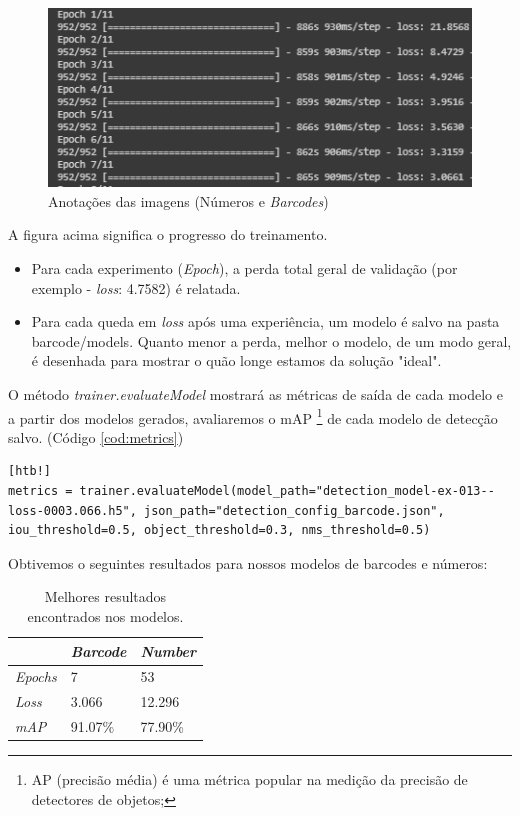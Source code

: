 \begin{figure}[htbp]
	\centering
	\includegraphics[width=1\linewidth]{figuras/MachineLearning/barcodeTraining.png}
	\caption{Anotações das imagens (Números e \textit{Barcodes})}
	\label{fig:barTrain}
\end{figure}

    A figura acima significa o progresso do treinamento.
\begin{itemize}
    \item Para cada experimento (\textit{Epoch}), a perda total geral de validação (por exemplo - \textit{loss}: 4.7582) é relatada.
    \item Para cada queda em \textit{loss} após uma experiência, um modelo é salvo na pasta barcode/models. Quanto menor a perda, melhor o modelo, de um modo geral, é desenhada para mostrar o quão longe estamos da solução "ideal". 
\end{itemize}

O método \textit{trainer.evaluateModel} mostrará as métricas de saída de cada modelo e a partir dos modelos gerados, avaliaremos o mAP \footnote{AP (precisão média) é uma métrica popular na medição da precisão de detectores de objetos;} de cada modelo de detecção salvo.  (Código \ref{cod:metrics})

\begin{lstlisting}[caption=Métricas de saída do modelo, label=cod:metrics][htb!]
metrics = trainer.evaluateModel(model_path="detection_model-ex-013--loss-0003.066.h5", json_path="detection_config_barcode.json", iou_threshold=0.5, object_threshold=0.3, nms_threshold=0.5)
\end{lstlisting}

Obtivemos o seguintes resultados para nossos modelos de barcodes e números:

\begin{table}[H]
	\centering
	\begin{tabular}{|l|l|l|}
		\hline
		\rowcolor[HTML]{ECF4FF} 
		\multicolumn{1}{|c|}{\cellcolor[HTML]{ECF4FF}\textit{Característica}} &
		\multicolumn{1}{|c|}{\cellcolor[HTML]{ECF4FF}\textit{Barcode}} & \multicolumn{1}{c|}{\cellcolor[HTML]{ECF4FF}\textit{Number}}\\ \hline
		\textit{Epochs} & 7 & 53\\ \hline
		\textit{Loss} & 3.066 & 12.296\\ \hline
		\textit{mAP} & 91.07\% & 77.90\%  \\ \hline
	\end{tabular}
	\caption{Melhores resultados encontrados nos modelos.}
	\label{tab:Result}
\end{table}

